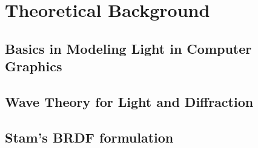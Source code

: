 \chapter{Theoretical Background}
\section{Basics in Modeling Light in Computer Graphics}
\section{Wave Theory for Light and Diffraction}
\section{Stam's BRDF formulation}